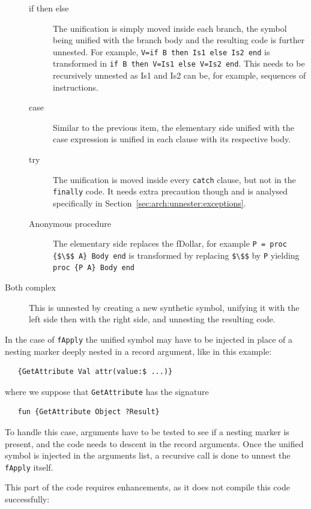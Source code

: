 \documentclass[a4paper]{memoir}
\begin{document}
\begin{description}
\begin{description}
      \item[if then else] The unification is simply moved inside each branch,
        the symbol being unified with the branch body and the resulting code is further unnested. For example, \lstinline!V=if B then Is1 else Is2 end! is transformed in \lstinline!if B then V=Is1 else V=Is2 end!. This needs to be recursively unnested as Is1 and Is2 can be, for example,  sequences of instructions.
      \item[case] Similar to the previous item, the elementary side  unified with the case expression is unified in each
        clause with its respective body.
      \item[try] The unification is moved inside every \lstinline!catch! clause, but not in
        the \lstinline!finally! code. It needs extra precaution though and is analysed specifically in
        Section~\ref{sec:arch:unnester:exceptions}.
      \item[Anonymous procedure] The elementary side replaces the fDollar, for
        example
        \lstinline[mathescape]!P = proc {$\$$ A} Body end! is transformed by replacing \lstinline[mathescape]{$\$$} by \lstinline!P! yielding
        \lstinline[mathescape]!proc {P A} Body end!
    \end{description}
  \item[Both complex] This is unnested by creating a new synthetic symbol, unifying it with the left side then with the right side, and unnesting the resulting code.
\end{description}

In the case of \lstinline!fApply! the unified
symbol may have to be injected in place of a nesting marker deeply nested in
a record argument, like in this example:

\begin{lstlisting}
   {GetAttribute Val attr(value:$ ...)}
\end{lstlisting}

where we suppose that \lstinline!GetAttribute! has the signature 
\begin{lstlisting}
   fun {GetAttribute Object ?Result}
\end{lstlisting}
To handle this case, arguments have to be tested to see if a nesting marker is
present, and the code needs to descent in the record arguments.
Once the unified symbol is injected in the arguments list, a recursive call is
done to unnest the \lstinline!fApply! itself.

This part of the code requires enhancements, as it does not compile this code successfully:
\end{document}
